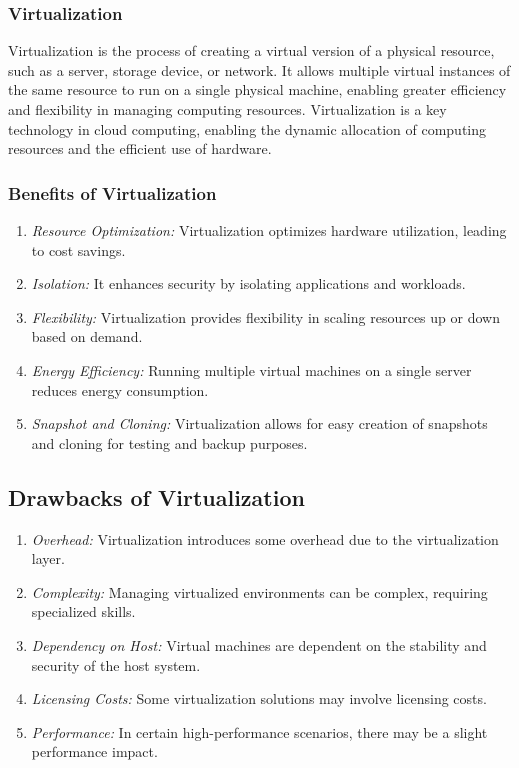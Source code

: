 \documentclass[11pt]{article}
\begin{document}
\subsubsection{Virtualization}

Virtualization is the process of creating a virtual version of a physical resource, such as a server, storage device, or network. It allows multiple virtual instances of the same resource to run on a single physical machine, enabling greater efficiency and flexibility in managing computing resources. Virtualization is a key technology in cloud computing, enabling the dynamic allocation of computing resources and the efficient use of hardware.


\subsubsection{Benefits of Virtualization}


\begin{enumerate}
    \item \textit{Resource Optimization:} Virtualization optimizes hardware utilization, leading to cost savings.
    \item \textit{Isolation:} It enhances security by isolating applications and workloads.
    \item \textit{Flexibility:} Virtualization provides flexibility in scaling resources up or down based on demand.
    \item \textit{Energy Efficiency:} Running multiple virtual machines on a single server reduces energy consumption.
    \item \textit{Snapshot and Cloning:} Virtualization allows for easy creation of snapshots and cloning for testing and backup purposes.
\end{enumerate}


\subsection{Drawbacks of Virtualization}

\begin{enumerate}
    \item \textit{Overhead:} Virtualization introduces some overhead due to the virtualization layer.
    \item \textit{Complexity:} Managing virtualized environments can be complex, requiring specialized skills.
    \item \textit{Dependency on Host:} Virtual machines are dependent on the stability and security of the host system.
    \item \textit{Licensing Costs:} Some virtualization solutions may involve licensing costs.
    \item \textit{Performance:} In certain high-performance scenarios, there may be a slight performance impact.
\end{enumerate}
\end{document}
